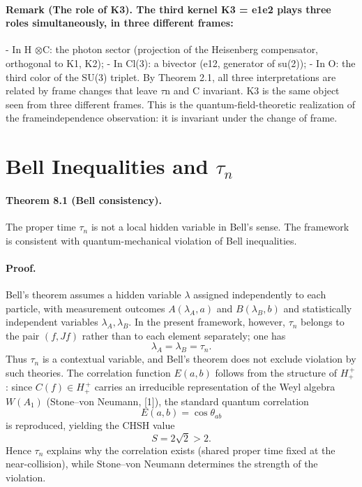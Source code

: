 \documentclass[12pt,a4paper]{article}
\begin{document}
\paragraph*{Remark (The role of K3). The third kernel K3 = e1e2 plays three roles simultaneously, in three different frames:}
- In H $\otimes$C: the photon sector (projection of the Heisenberg compensator,
orthogonal to K1, K2);
- In Cl(3): a bivector (e12, generator of su(2));
- In O: the third color of the SU(3) triplet.
By Theorem 2.1, all three interpretations are related by frame changes that leave $\tau$n and C invariant. K3 is the same object seen from three different frames. This is the quantum-field-theoretic realization of the frameindependence observation: it is invariant under the change of frame.

\section{Bell Inequalities and \texorpdfstring{$\tau_n$}{tau_n}}
\paragraph*{Theorem 8.1 (Bell consistency).}
The proper time $\tau_n$ is not a local hidden variable in Bell's sense. The framework is consistent with quantum-mechanical violation of Bell inequalities.

\paragraph*{Proof.}
Bell's theorem assumes a hidden variable $\lambda$ assigned independently to each particle, with measurement outcomes $A(\lambda_A,a)$ and $B(\lambda_B,b)$ and statistically independent variables $\lambda_A,\lambda_B$. In the present framework, however, $\tau_n$ belongs to the pair $(f,Jf)$ rather than to each element separately; one has
\[
\lambda_A = \lambda_B = \tau_n.
\]
Thus $\tau_n$ is a contextual variable, and Bell's theorem does not exclude violation by such theories. The correlation function $E(a,b)$ follows from the structure of $H_+^{\,+}$: since $C(f) \in H_+^{\,+}$ carries an irreducible representation of the Weyl algebra $W(A_1)$ (Stone--von Neumann, [1]), the standard quantum correlation
\[
E(a,b)=\cos \theta_{ab}
\]
is reproduced, yielding the CHSH value
\[
S = 2\sqrt{2} > 2.
\]
Hence $\tau_n$ explains why the correlation exists (shared proper time fixed at the near-collision), while Stone--von Neumann determines the strength of the violation.
\end{document}
